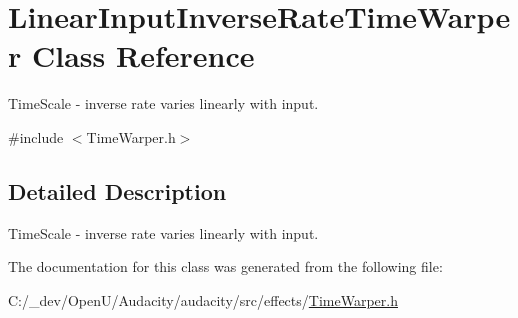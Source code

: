 \hypertarget{class_linear_input_inverse_rate_time_warper}{}\section{Linear\+Input\+Inverse\+Rate\+Time\+Warper Class Reference}
\label{class_linear_input_inverse_rate_time_warper}


Time\+Scale -\/ inverse rate varies linearly with input.  




{\ttfamily \#include $<$Time\+Warper.\+h$>$}



\subsection{Detailed Description}
Time\+Scale -\/ inverse rate varies linearly with input. 

The documentation for this class was generated from the following file\+:\begin{DoxyCompactItemize}
\item 
C\+:/\+\_\+dev/\+Open\+U/\+Audacity/audacity/src/effects/\hyperlink{_time_warper_8h}{Time\+Warper.\+h}\end{DoxyCompactItemize}
